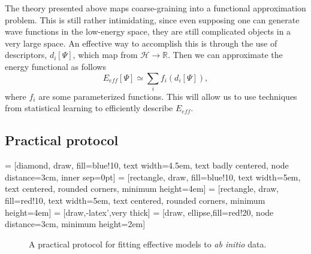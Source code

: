 The theory presented above maps coarse-graining into a functional approximation problem. 
This is still rather intimidating, since even supposing one can generate wave functions in the low-energy space, they are still complicated objects in a very large space.
An effective way to accomplish this is through the use of descriptors, $d_i[\Psi]$, which map from ${\mathcal H} \rightarrow \mathbb{R}$.
Then we can approximate the energy functional as follows
\begin{equation}
E_{eff}[\Psi] \simeq \sum_i f_i(d_i[\Psi]),
\end{equation}
where $f_i$ are some parameterized functions.
This will allow us to use techniques from statistical learning to efficiently describe $E_{eff}$. 
\subsection{Practical protocol}

 = [diamond, draw, fill=blue!10, 
    text width=4.5em, text badly centered, node distance=3cm, inner sep=0pt]
 = [rectangle, draw, fill=blue!10, 
    text width=5em, text centered, rounded corners, minimum height=4em]
 = [rectangle, draw, fill=red!10, 
    text width=5em, text centered, rounded corners, minimum height=4em]
 = [draw,-latex',very thick]
 = [draw, ellipse,fill=red!20, node distance=3cm,
    minimum height=2em]
\begin{figure*}[hbt]
\caption{A practical protocol for fitting effective models to {\it ab initio} data.}
\label{fig:protocol} 
\end{figure*}

